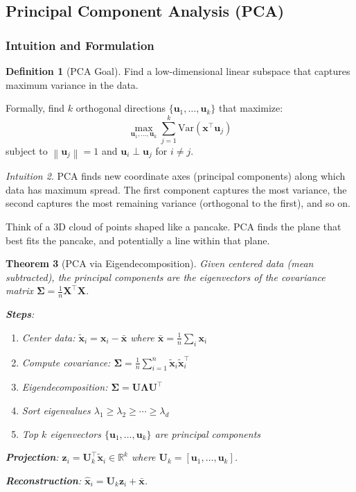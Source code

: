 \documentclass[11pt,twoside]{article}
\numberwithin{equation}{section}
\newcommand{\Var}{\mathrm{Var}}
\newcommand{\R}{\mathbb{R}}
\newcommand{\vect}[1]{\bm{#1}}
\newcommand{\mat}[1]{\bm{#1}}
\newcommand{\norm}[1]{\left\lVert#1\right\rVert}
\theoremstyle{plain}
\newtheorem{theorem}{Theorem}[section]
\theoremstyle{definition}
\newtheorem{definition}[theorem]{Definition}
\theoremstyle{remark}
\newtheorem{intuition}[theorem]{Intuition}
\begin{document}
\subsection{Principal Component Analysis (PCA)}

\subsubsection{Intuition and Formulation}

\begin{definition}[PCA Goal]
Find a low-dimensional linear subspace that captures maximum variance in the data.

Formally, find $k$ orthogonal directions $\{\vect{u}_1, \ldots, \vect{u}_k\}$ that maximize:
\[
\max_{\vect{u}_1, \ldots, \vect{u}_k} \sum_{j=1}^k \Var(\vect{x}^\top \vect{u}_j)
\]
subject to $\norm{\vect{u}_j} = 1$ and $\vect{u}_i \perp \vect{u}_j$ for $i \neq j$.
\end{definition}

\begin{intuition}
PCA finds new coordinate axes (principal components) along which data has maximum spread. The first component captures the most variance, the second captures the most remaining variance (orthogonal to the first), and so on.

Think of a 3D cloud of points shaped like a pancake. PCA finds the plane that best fits the pancake, and potentially a line within that plane.
\end{intuition}

\begin{theorem}[PCA via Eigendecomposition]
Given centered data (mean subtracted), the principal components are the eigenvectors of the covariance matrix $\mat{\Sigma} = \frac{1}{n}\mat{X}^\top\mat{X}$.

\textbf{Steps}:
\begin{enumerate}
\item Center data: $\tilde{\vect{x}}_i = \vect{x}_i - \bar{\vect{x}}$ where $\bar{\vect{x}} = \frac{1}{n}\sum_i \vect{x}_i$
\item Compute covariance: $\mat{\Sigma} = \frac{1}{n}\sum_{i=1}^n \tilde{\vect{x}}_i\tilde{\vect{x}}_i^\top$
\item Eigendecomposition: $\mat{\Sigma} = \mat{U}\mat{\Lambda}\mat{U}^\top$
\item Sort eigenvalues $\lambda_1 \geq \lambda_2 \geq \cdots \geq \lambda_d$
\item Top $k$ eigenvectors $\{\vect{u}_1, \ldots, \vect{u}_k\}$ are principal components
\end{enumerate}

\textbf{Projection}: $\vect{z}_i = \mat{U}_k^\top \tilde{\vect{x}}_i \in \R^k$ where $\mat{U}_k = [\vect{u}_1, \ldots, \vect{u}_k]$.

\textbf{Reconstruction}: $\hat{\vect{x}}_i = \mat{U}_k \vect{z}_i + \bar{\vect{x}}$.
\end{theorem}
\end{document}
